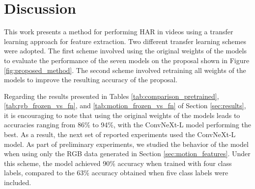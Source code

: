 \documentclass[mathematics,article,submit,pdftex,moreauthors]{Definitions/mdpi}
\begin{document}
\section{Discussion}

This work presents a method for performing HAR in videos using a transfer learning approach for feature extraction. Two different transfer learning schemes were adopted. The first scheme involved using the original weights of the models to evaluate the performance of the seven models on the proposal shown in Figure \ref{fig:proposed_method}. The second scheme involved retraining all weights of the models to improve the resulting accuracy of the proposal. 

Regarding the results presented in Tables \ref{tab:comparison_pretrained}, \ref{tab:rgb_frozen_vs_fn}, and \ref{tab:motion_frozen_vs_fn} of Section \ref{sec:results}, it is encouraging to note that using the original weights of the models leads to accuracies ranging from 86\% to 94\%, with the ConvNeXt-L model performing the best. As a result, the next set of reported experiments used the ConvNeXt-L model. As part of preliminary experiments, we studied the behavior of the model when using only the RGB data generated in Section \ref{sec:motion_features}. Under this scheme, the model achieved 90\% accuracy when trained with four class labels, compared to the 63\% accuracy obtained when five class labels were included.
\end{document}
